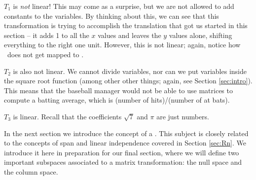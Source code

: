 {$T_1$ is \textit{not} linear! This may come as a surprise, but we are not allowed to add constants to the variables. By thinking about this, we can see that this transformation is trying to accomplish the translation that got us started in this section -- it adds 1 to all the $x$ values and leaves the $y$ values alone, shifting everything to the right one unit. However, this is not linear; again, notice how \zero\ does not get mapped to \zero.

$T_2$ is also not linear. We cannot divide variables, nor can we put variables inside the square root function (among other other things; again, see Section \ref{sec:intro}). This means that the baseball manager would not be able to use matrices to compute a batting average, which is (number of hits)/(number of at bats).

$T_3$ is linear. Recall that the coefficients $\sqrt{7}$ and $\pi$ are just numbers.
}

\medskip

In the next section we introduce the concept of a . This subject is closely related to the concepts of span and linear independence covered in Section \ref{sec:Rn}. We introduce it here in preparation for our final section, where we will define two important subspaces associated to a matrix transformation: the null space and the column space.\\




